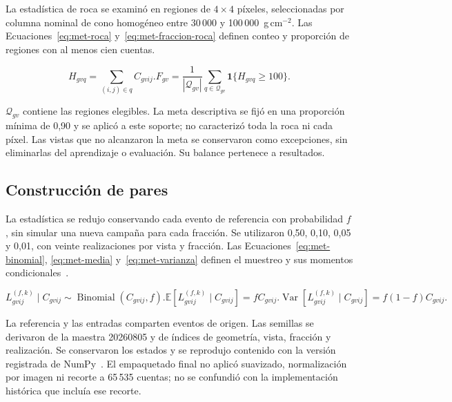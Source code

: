 La estadística de roca se examinó en regiones de $4\times4$ píxeles, seleccionadas por columna nominal de cono homogéneo entre 30\,000 y 100\,000~g\,cm$^{-2}$. Las Ecuaciones~\eqref{eq:met-roca} y~\eqref{eq:met-fraccion-roca} definen conteo y proporción de regiones con al menos cien cuentas.
\begin{samepage}
\begin{subequations}
\begin{equation}H_{gvq}=\sum_{(i,j)\in q}C_{gvij}.\label{eq:met-roca}\end{equation}
\begin{equation}F_{gv}=\frac1{|\mathcal Q_{gv}|}\sum_{q\in\mathcal Q_{gv}}\mathbf1\{H_{gvq}\geq100\}.\label{eq:met-fraccion-roca}\end{equation}
\end{subequations}
\end{samepage}
$\mathcal Q_{gv}$ contiene las regiones elegibles. La meta descriptiva se fijó en una proporción mínima de 0,90 y se aplicó a este soporte; no caracterizó toda la roca ni cada píxel. Las vistas que no alcanzaron la meta se conservaron como excepciones, sin eliminarlas del aprendizaje o evaluación. Su balance pertenece a resultados.

\subsection{Construcción de pares}\label{subsec:met-pares}
La estadística se redujo conservando cada evento de referencia con probabilidad $f$, sin simular una nueva campaña para cada fracción. Se utilizaron 0,50, 0,10, 0,05 y 0,01, con veinte realizaciones por vista y fracción. Las Ecuaciones~\eqref{eq:met-binomial}, \eqref{eq:met-media} y~\eqref{eq:met-varianza} definen el muestreo y sus momentos condicionales~\parencite{kingman1992}.
\begin{samepage}
\begin{subequations}
\begin{equation}L^{(f,k)}_{gvij}\mid C_{gvij}\sim\operatorname{Binomial}(C_{gvij},f).\label{eq:met-binomial}\end{equation}
\begin{equation}\mathbb E[L^{(f,k)}_{gvij}\mid C_{gvij}]=fC_{gvij}.\label{eq:met-media}\end{equation}
\begin{equation}\operatorname{Var}[L^{(f,k)}_{gvij}\mid C_{gvij}]=f(1-f)C_{gvij}.\label{eq:met-varianza}\end{equation}
\end{subequations}
\end{samepage}
La referencia y las entradas comparten eventos de origen. Las semillas se derivaron de la maestra 20260805 y de índices de geometría, vista, fracción y realización. Se conservaron los estados y se reprodujo contenido con la versión registrada de NumPy~\parencite{harris2020}. El empaquetado final no aplicó suavizado, normalización por imagen ni recorte a 65\,535 cuentas; no se confundió con la implementación histórica que incluía ese recorte.


